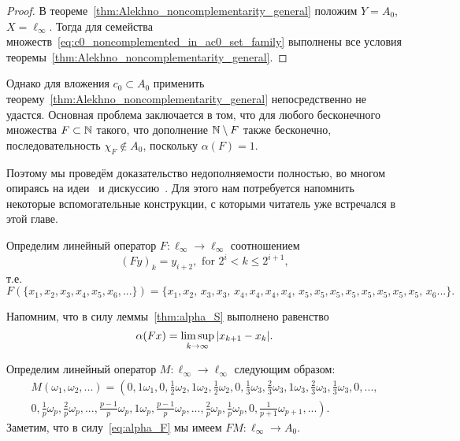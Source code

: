 \begin{proof}
	В теореме~\ref{thm:Alekhno_noncomplementarity_general}
	положим $Y=A_0$, $X=\ell_\infty$.
	Тогда для семейства множеств~\eqref{eq:c0_noncomplemented_in_ac0_set_family}
	выполнены все условия теоремы~\ref{thm:Alekhno_noncomplementarity_general}.
\end{proof}

Однако для вложения $c_0 \subset A_0$ применить теорему~\ref{thm:Alekhno_noncomplementarity_general}
непосредственно не удастся.
Основная проблема заключается в том, что для любого бесконечного множества $F \subset \mathbb{N}$ такого, что
дополнение $\mathbb{N} \setminus F$ также бесконечно, последовательность $\chi_F \notin A_0$,
поскольку $\alpha(F) = 1$.

Поэтому мы проведём доказательство недополняемости полностью,
во многом опираясь на идеи~\cite{whitley1968projecting} и дискуссию~\cite{mathSE_Phillips}.
Для этого нам потребуется напомнить некоторые вспомогательные конструкции,
с которыми читатель уже встречался в этой главе.


Определим линейный оператор  $F:\ell_\infty \to \ell_\infty$ соотношением
\begin{equation}
	\label{operator_F}
	(Fy)_k = y_{i+2}, \mbox{ for } 2^i < k \leq 2^{i+1}
	,
\end{equation}
т.е.
\begin{equation}
	F(\{x_1,x_2,x_3,x_4,x_5,x_6, ...\}) = \{x_1,x_2,\,x_3,x_3,\,x_4,x_4,x_4,x_4,\,x_5,x_5,x_5,x_5,x_5,x_5,x_5,x_5,\,x_6...\}
	.
\end{equation}

Напомним, что в силу леммы~\ref{thm:alpha_S} выполнено равенство
\begin{equation}
	\label{eq:alpha_F}
	\alpha(Fx) = \varlimsup_{k\to\infty} |x_{k+1} - x_{k}|
	.
\end{equation}


Определим линейный оператор $M:\ell_\infty \to \ell_\infty$ следующим образом:
\begin{multline*}
	M(\omega_1,\omega_2,...)=\left(
		0, 1\omega_1,
		0, \frac{1}{2}\omega_2, 1\omega_2, \frac{1}{2}\omega_2,
		0, \frac{1}{3}\omega_3, \frac{2}{3}\omega_3, 1\omega_3, \frac{2}{3}\omega_3, \frac{1}{3}\omega_3,
		0, ...,
	\right. \\ \left.
		0, \frac{1}{p}\omega_p, \frac{2}{p}\omega_p, ..., \frac{p-1}{p}\omega_p, 1\omega_p,
			\frac{p-1}{p}\omega_p, ..., \frac{2}{p}\omega_p, \frac{1}{p}\omega_p,
		0, \frac{1}{p+1}\omega_{p+1}, ...
	\right)
	.
\end{multline*}
Заметим, что в силу~\eqref{eq:alpha_F} мы имеем $FM: \ell_\infty \to A_0$.


